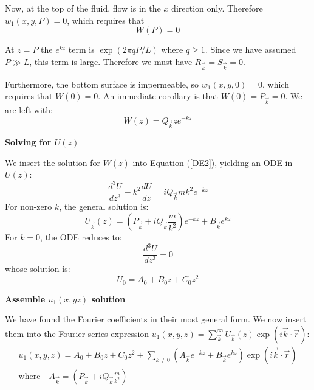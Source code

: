 \documentclass[12pt, a4paper, twoside, openright]{book}
\begin{document}
Now, at the top of the fluid, flow is in the $x$ direction only.  Therefore $w_1(x,y,P) = 0$, which requires that
\begin{equation}
W(P) = 0
\end{equation} 

At $z=P$ the $e^{kz}$ term is $ \exp ( 2 \pi q P/L ) $ where $q \geq 1$.  Since we have assumed $P \gg L$, this term is large. Therefore we must have $R_{\vec{k}} = S_{\vec{k}} = 0$.


Furthermore, the bottom surface is impermeable, so $w_1(x,y,0) = 0$, which requires that $W(0) = 0$.  An immediate corollary is that $W(0) = P_{\vec{k}} = 0$.
We are left with:
\begin{equation}
W(z) = Q_{\vec{k}} z e^{-kz}
\end{equation} 


\textbf{Solving for $U(z)$}

We insert the solution for $W(z)$ into Equation (\ref{DE2}), yielding an ODE in $U(z)$:
\begin{equation}
\frac{d^3 U}{dz^3} - k^2 \frac{d U}{dz} = i Q_{\vec{k}} m k^2 e^{-kz} 
\end{equation}
For non-zero $k$, the general solution is:
\begin{equation}
U_{\vec{k}}(z) = \left( P_{\vec{k}} + i Q_{\vec{k}} \frac{m}{k^2} \right) e^{-kz}
+ B_{\vec{k}} e^{kz}
\end{equation}
For $k = 0$, the ODE reduces to:
\begin{equation}
\frac{d^3 U}{dz^3} = 0
\end{equation}
whose solution is:
\begin{equation}
U_0 = A_0 + B_0 z + C_0 z^2
\end{equation}


\textbf{Assemble $u_1(x,yz)$ solution}

We have found the Fourier coefficients in their most general form.  We now insert them into the Fourier series expression $ u_1(x,y,z) = \sum_{\vec{k}}^{\infty} U_{\vec{k}}(z) \exp(i \vec{k}\cdot \vec{r}) $:
\begin{gather}
u_1(x,y,z) = A_0 + B_0 z + C_0 z^2 + \sum_{k \neq 0} 
\left(  A_{\vec{k}} e^{-kz} + B_{\vec{k}} e^{kz} \right)
\exp(i \vec{k}\cdot \vec{r})\\
\text{where} \quad
A_{\vec{k}} = \left( P_{\vec{k}} + i Q_{\vec{k}} \frac{m}{k^2} \right)
\end{gather}
\end{document}
